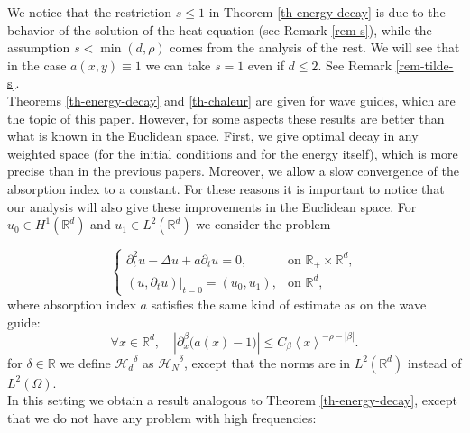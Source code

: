 \documentclass[10pt, a4paper,reqno]{amsart}
\theoremstyle{plain}
\theoremstyle{definition}
\theoremstyle{remark}
\begin{document}
We notice that the restriction $s {\leqslant} 1$ in Theorem \ref{th-energy-decay} is due to the behavior of the solution of the heat equation (see Remark \ref{rem-s}), while the assumption $s < \min(d,\rho)$ comes from the analysis of the rest. We will see that in the case $a(x,y) \equiv 1$ we can take $s = 1$ even if $d {\leqslant} 2$. See Remark \ref{rem-tilde-s}.\\

Theorems \ref{th-energy-decay} and \ref{th-chaleur} are given for wave guides, which are the topic of this paper. However, for some aspects these results are better than what is known in the Euclidean space. First, we give optimal decay in any weighted space (for the initial conditions and for the energy itself), which is more precise than in the previous papers. Moreover, we allow a slow convergence of the absorption index to a constant. For these reasons it is important to notice that our analysis will also give these improvements in the Euclidean space. For $u_0 \in H^1({\mathbb{R}}^d)$ and $u_1 \in L^2({\mathbb{R}}^d)$ we consider the problem

\begin{equation} \label{wave-eucl}
\begin{cases}
\partial_t^2 u  -{\Delta} u + a \partial_t u = 0,  & \text{on  }  {\mathbb{R}}_+ \times {\mathbb{R}}^d, \\
{\left.{(u , \partial_t u )}\right|_{{t = 0}}} = (u_0, u_1), &  \text{on } {\mathbb{R}}^d,
\end{cases}
\end{equation}
where absorption index $a$ satisfies the same kind of estimate as on the wave guide:
\begin{equation} \label{hyp-amort-inf-Rd}
\forall x \in {\mathbb{R}}^d, \quad {\left\vert {\partial_x^{\beta} \big(a(x)-1\big)}\right\vert} {\leqslant} C_{\beta} {\left< x \right>}^{-\rho-{\left\vert {\beta}\right\vert}}.
\end{equation}
for ${\delta} \in {\mathbb{R}}$ we define ${\mathcal H_d}^{\delta}$ as ${\mathcal H_N}^{\delta}$, except that the norms are in $L^2({\mathbb{R}}^d)$ instead of $L^2({\Omega})$.\\

In this setting we obtain a result analogous to Theorem \ref{th-energy-decay}, except that we do not have any problem with high frequencies:
\end{document}

